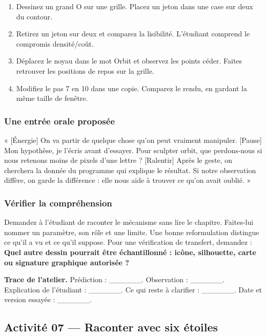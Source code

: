 \documentclass[
  canadien,
  11pt,
  letterpaper,
]{article}
\providecommand{\tightlist}{%
  \setlength{\itemsep}{0pt}\setlength{\parskip}{0pt}}
\begin{document}
\begin{enumerate}
\def\labelenumi{\arabic{enumi}.}
\tightlist
\item
  Dessinez un grand O sur une grille. Placez un jeton dans une case sur
  deux du contour.
\item
  Retirez un jeton sur deux et comparez la lisibilité. L'étudiant
  comprend le compromis densité/coût.
\item
  Déplacez le noyau dans le mot Orbit et observez les points céder.
  Faites retrouver les positions de repos sur la grille.
\item
  Modifiez le pas 7 en 10 dans une copie. Comparez le rendu, en gardant
  la même taille de fenêtre.
\end{enumerate}

\subsubsection{Une entrée orale
proposée}\label{une-entruxe9e-orale-proposuxe9e-5}

« {[}Énergie{]} On va partir de quelque chose qu'on peut vraiment
manipuler. {[}Pause{]} Mon hypothèse, je l'écris avant d'essayer. Pour
sculpter orbit, que perdons-nous si nous retenons moins de pixels d'une
lettre ? {[}Ralentir{]} Après le geste, on cherchera la donnée du
programme qui explique le résultat. Si notre observation diffère, on
garde la différence : elle nous aide à trouver ce qu'on avait oublié. »

\subsubsection{Vérifier la
compréhension}\label{vuxe9rifier-la-compruxe9hension-5}

Demandez à l'étudiant de raconter le mécanisme sans lire le chapitre.
Faites-lui nommer un paramètre, son rôle et une limite. Une bonne
reformulation distingue ce qu'il a vu et ce qu'il suppose. Pour une
vérification de transfert, demandez : \textbf{Quel autre dessin pourrait
être échantillonné : icône, silhouette, carte ou signature graphique
autorisée ?}

\textbf{Trace de l'atelier.} Prédiction : \_\_\_\_\_\_. Observation :
\_\_\_\_\_\_. Explication de l'étudiant : \_\_\_\_\_\_. Ce qui reste à
clarifier : \_\_\_\_\_\_. Date et version essayée : \_\_\_\_\_\_.

\subsection{Activité 07 --- Raconter avec six
étoiles}\label{activituxe9-07-raconter-avec-six-uxe9toiles}
\end{document}

